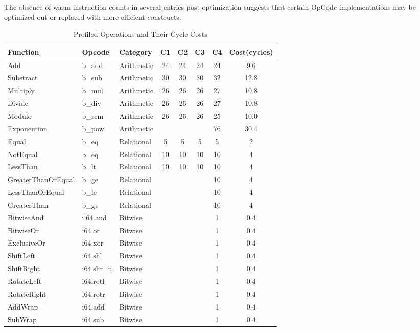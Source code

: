 The absence of wasm instruction counts in several entries post-optimization suggests that certain OpCode implementations may be optimized out or replaced with more efficient constructs.


\begin{table}[ht]
    \centering
    \caption{Profiled Operations and Their Cycle Costs}
    \label{tab:operation_cycles}
    \begin{tabular}{|p{}|l|l|c|c|c|c|c|}
        \hline
    \textbf{Function} & \textbf{Opcode} & \textbf{Category} & \textbf{C1} & \textbf{C2} & \textbf{C3} & \textbf{C4} & \textbf{Cost(cycles)} \\
    \hline
    Add & b\_add & Arithmetic & 24 & 24 & 24 & 24 & 9.6 \\
    Substract & b\_sub & Arithmetic & 30 & 30 & 30 & 32 & 12.8 \\
    Multiply & b\_mul & Arithmetic & 26 & 26 & 26 & 27 & 10.8 \\
    Divide & b\_div & Arithmetic & 26 & 26 & 26 & 27 & 10.8 \\
    Modulo & b\_rem & Arithmetic & 26 & 26 & 26 & 25 & 10.0 \\
    Exponention & b\_pow & Arithmetic & & & & 76 & 30.4 \\
    Equal & b\_eq & Relational & 5 & 5 & 5 & 5 & 2 \\
    NotEqual & b\_eq & Relational & 10 & 10 & 10 & 10 & 4 \\
    LessThan & b\_lt & Relational & 10 & 10 & 10 & 10 & 4 \\
    GreaterThanOrEqual & b\_ge & Relational & & & & 10 & 4 \\
    LessThanOrEqual & b\_le & Relational & & & & 10 & 4 \\
    GreaterThan & b\_gt & Relational & & & & 10 & 4 \\
    BitwiseAnd & i.64.and & Bitwise & & & & 1 & 0.4 \\
    BitwiseOr & i64.or & Bitwise & & & & 1 & 0.4 \\
    ExclusiveOr & i64.xor & Bitwise & & & & 1 & 0.4 \\
    ShiftLeft & i64.shl & Bitwise & & & & 1 & 0.4 \\
    ShiftRight & i64.shr\_u & Bitwise & & & & 1 & 0.4 \\
    RotateLeft & i64.rotl & Bitwise & & & & 1 & 0.4 \\
    RotateRight & i64.rotr & Bitwise & & & & 1 & 0.4 \\
    AddWrap & i64.add & Bitwise & & & & 1 & 0.4 \\
    SubWrap & i64.sub & Bitwise & & & & 1 & 0.4 \\
    \hline
    \end{tabular}
    \end{table}
 
